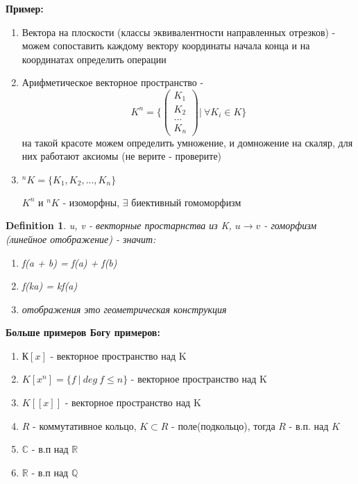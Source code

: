 \documentclass[12pt]{article}
\newtheorem{definition}{Definition}
\begin{document}
\textbf{Пример:}  
\begin{enumerate}
    \item Вектора на плоскости (классы эквивалентности направленных отрезков) - можем сопоставить каждому вектору координаты начала конца и на координатах определить операции
    \item Арифметическое векторное пространство - $$K^n = \{ \begin{pmatrix}
    K_1 \\
    K_2\\
    ... \\
    K_n
  \end{pmatrix} |\  \forall K_i \in K\}$$ на такой красоте можем определить умножение, и домножение на скаляр, для них работают аксиомы (не верите - проверите)
  \item $ ^nK = \{ K_1, K_2, ..., K_n \}$ 
  
  $K^n$ и $ ^nK$ - изоморфны, $\exists$ биективный гомоморфизм
\end{enumerate} 

 



\begin{definition}
    u, v - векторные простарнства из K, $u \rightarrow v$ - гоморфизм (линейное отображение) - значит:
    \begin{enumerate}
        \item f(a + b) = f(a) + f(b)
        \item f(ka) = kf(a) 
        \item отображения это геометрическая конструкция
    \end{enumerate}
\end{definition} 


\textbf{Больше примеров Богу примеров:}
\begin{enumerate}
    \item $К[x]$ - векторное пространство над K
    \item $K[x^n]=\{f\ |\ deg\ f\leq n\}$ - векторное пространство над K
    \item $K[[x]]$ - векторное пространство над K
    \item $R$ - коммутативное кольцо, $K \subset R$ - поле(подкольцо), тогда $R$ - в.п. над $K$
    \item $\mathbb{C}$ - в.п над $\mathbb{R}$
    \item $\mathbb{R}$ - в.п над $\mathbb{Q}$
\end{enumerate}
\end{document}
